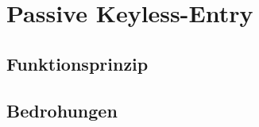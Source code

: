 \chapter{\foreignlanguage{english}{Passive Keyless-Entry}}

\section{Funktionsprinzip}

\section{Bedrohungen}
